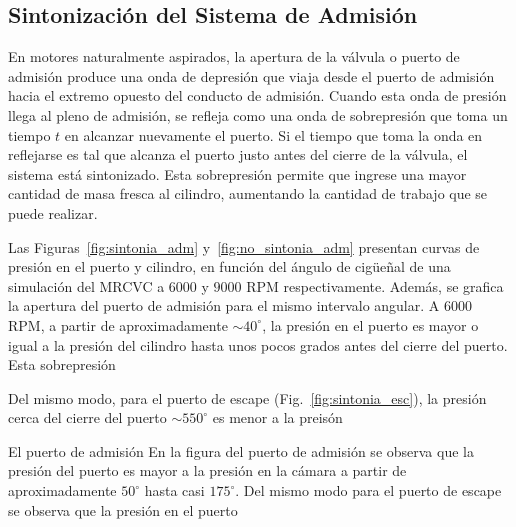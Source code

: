 \subsection{Sintonización del Sistema de Admisión}
%
En motores naturalmente aspirados, la apertura de la válvula o puerto de
admisión produce una onda de depresión que viaja desde el puerto de admisión
hacia el extremo opuesto del conducto de admisión.
%
Cuando esta onda de presión llega al pleno de admisión, se refleja como una
onda de sobrepresión que toma un tiempo $t$ en alcanzar nuevamente el puerto.
%
Si el tiempo que toma la onda en reflejarse es tal que alcanza el puerto justo
antes del cierre de la válvula, el sistema está sintonizado.
%
Esta sobrepresión permite que ingrese una mayor cantidad de masa fresca al
cilindro, aumentando la cantidad de trabajo que se puede realizar.

%

Las Figuras~\ref{fig:sintonia_adm} y~\ref{fig:no_sintonia_adm} presentan curvas
de presión en el puerto y cilindro, en función del ángulo de cigüeñal de una
simulación del MRCVC a $6000$ y $9000$ RPM respectivamente.
%
Además, se grafica la apertura del puerto de admisión para el mismo intervalo
angular.
%
%
A $6000$ RPM, a partir de aproximadamente $\sim 40^{\circ}$, la presión en el
puerto es mayor o igual a la presión del cilindro hasta unos pocos grados antes
del cierre del puerto.
%
Esta sobrepresión

%
Del mismo modo, para el puerto de escape (Fig.~\ref{fig:sintonia_esc}), la
presión cerca del cierre del puerto $\sim 550^{\circ}$ es menor a la preisón


El puerto de admisión
En la figura del puerto de admisión se observa que la presión del puerto es
mayor a la presión en la cámara a partir de aproximadamente $50^{\circ}$ hasta
casi $175^{\circ}$.
%
Del mismo modo para el puerto de escape se observa que la presión en el puerto






